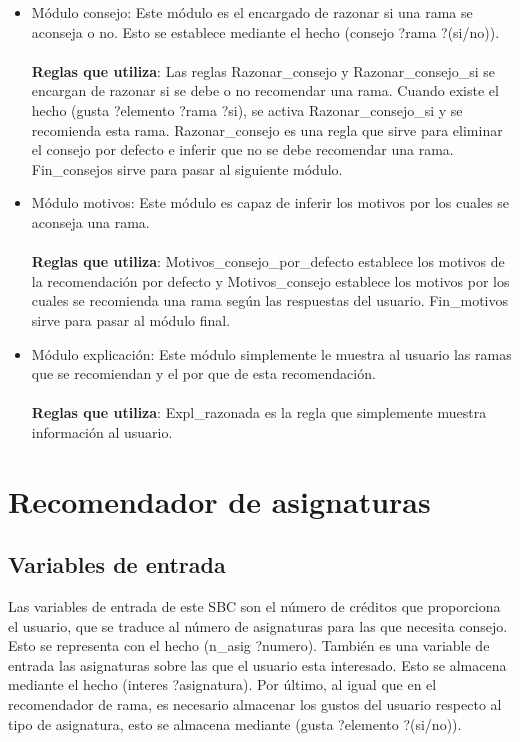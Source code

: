\begin{itemize}
   \item Módulo consejo: Este módulo es el encargado de razonar si una rama se aconseja o no. Esto se establece mediante el hecho (consejo ?rama ?(si/no)).
   \\\\
   \textbf{Reglas que utiliza}: Las reglas Razonar\_consejo y Razonar\_consejo\_si se encargan de razonar si se debe o no recomendar una rama. Cuando existe el hecho (gusta ?elemento ?rama ?si), se activa Razonar\_consejo\_si y se recomienda esta rama. Razonar\_consejo es una regla que sirve para eliminar el consejo por defecto e inferir que no se debe recomendar una rama. Fin\_consejos sirve para pasar al siguiente módulo.

   \item Módulo motivos: Este módulo es capaz de inferir los motivos por los cuales se aconseja una rama.
   \\\\
   \textbf{Reglas que utiliza}: Motivos\_consejo\_por\_defecto establece los motivos de la recomendación por defecto y Motivos\_consejo establece los motivos por los cuales se recomienda una rama según las respuestas del usuario. Fin\_motivos sirve para pasar al módulo final.

   \item Módulo explicación: Este módulo simplemente le muestra al usuario las ramas que se recomiendan y el por que de esta recomendación.
   \\\\
   \textbf{Reglas que utiliza}: Expl\_razonada es la regla que simplemente muestra información al usuario.

\end{itemize}

\section{Recomendador de asignaturas}
\subsection{Variables de entrada}
Las variables de entrada de este SBC son el número de créditos que proporciona el usuario, que se traduce al número de asignaturas para las que necesita consejo. Esto se representa con el hecho (n\_asig ?numero). También es una variable de entrada las asignaturas sobre las que el usuario esta interesado. Esto se almacena mediante el hecho (interes ?asignatura). Por último, al igual que en el recomendador de rama, es necesario almacenar los gustos del usuario respecto al tipo de asignatura, esto se almacena mediante (gusta ?elemento ?(si/no)).
